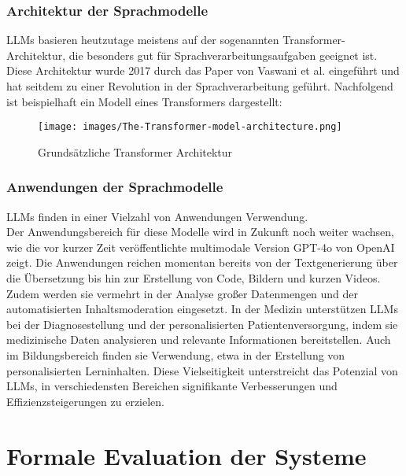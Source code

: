\documentclass[german,report]{i1thesis}
\begin{document}
\subsubsection{Architektur der Sprachmodelle}

\acp{LLM} basieren heutzutage meistens auf der sogenannten Transformer-Architektur, die besonders gut für Sprachverarbeitungsaufgaben geeignet ist.
Diese Architektur wurde 2017 durch das Paper  von Vaswani et al. \autocite{attention} eingeführt und hat seitdem zu einer Revolution in der Sprachverarbeitung geführt.
Nachfolgend ist beispielhaft ein Modell eines Transformers dargestellt:\\

\begin{figure}[H]
    \centering
    \texttt{[image: images/The-Transformer-model-architecture.png]}
    \caption{Grundsätzliche Transformer Architektur \autocite{yuening2019}}%
    \label{fig:transformer}
\end{figure}


\subsubsection{Anwendungen der Sprachmodelle}


\acp{LLM} finden in einer Vielzahl von Anwendungen Verwendung.\\
Der Anwendungsbereich für diese Modelle wird in Zukunft noch weiter wachsen, wie die vor kurzer Zeit veröffentlichte multimodale Version GPT-4o \autocite{gpt4o} von OpenAI \autocite{openai} zeigt.
Die Anwendungen reichen momentan bereits von der Textgenerierung über die Übersetzung bis hin zur Erstellung von Code, Bildern und kurzen Videos.
Zudem werden sie vermehrt in der Analyse großer Datenmengen und der automatisierten Inhaltsmoderation eingesetzt.
In der Medizin unterstützen \acp{LLM} bei der Diagnosestellung und der personalisierten Patientenversorgung, indem sie medizinische Daten analysieren und relevante Informationen bereitstellen.
Auch im Bildungsbereich finden sie Verwendung, etwa in der Erstellung von personalisierten Lerninhalten.
Diese Vielseitigkeit unterstreicht das Potenzial von \acp{LLM}, in verschiedensten Bereichen signifikante Verbesserungen und Effizienzsteigerungen zu erzielen.

\newpage
\section{Formale Evaluation der Systeme}%
\label{sec:formale-evaluation}
\end{document}
